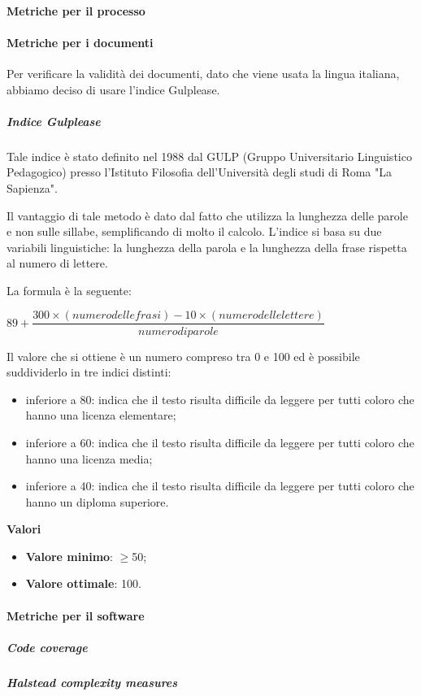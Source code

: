\paragraph{Metriche per il processo}
\paragraph{Metriche per i documenti}
Per verificare la validità dei documenti, dato che viene usata la lingua italiana, abbiamo deciso di usare l'indice Gulplease. 
\subparagraph*{Indice Gulplease}
Tale indice è stato definito nel 1988 dal GULP (Gruppo Universitario Linguistico Pedagogico) presso l'Istituto Filosofia dell'Università degli studi di Roma "La Sapienza".

Il vantaggio di tale metodo è dato dal fatto che utilizza la lunghezza delle parole e non sulle sillabe, semplificando di molto il calcolo. L'indice si basa su due variabili linguistiche: la lunghezza della parola e la lunghezza della frase rispetta al numero di lettere.

La formula è la seguente:
\begin{center}
	$89+\dfrac{300\times(numerodellefrasi)-10\times(numero delle lettere)}{numero di parole}$
\end{center}
Il valore che si ottiene è un numero compreso tra 0 e 100 ed è possibile suddividerlo in tre indici distinti:
\begin{itemize}
	\item inferiore a 80: indica che il testo risulta difficile da leggere per tutti coloro che hanno una licenza elementare;
	\item inferiore a 60: indica che il testo risulta difficile da leggere per tutti coloro che hanno una licenza media;
	\item inferiore a 40: indica che il testo risulta difficile da leggere per tutti coloro che hanno un diploma superiore.
\end{itemize}
\textbf{Valori}
\begin{itemize}
	\item \textbf{Valore minimo}: $\geq$50;
	\item \textbf{Valore ottimale}: 100.
\end{itemize}
\paragraph{Metriche per il software}
\subparagraph*{Code coverage}
\subparagraph*{Halstead complexity measures}
